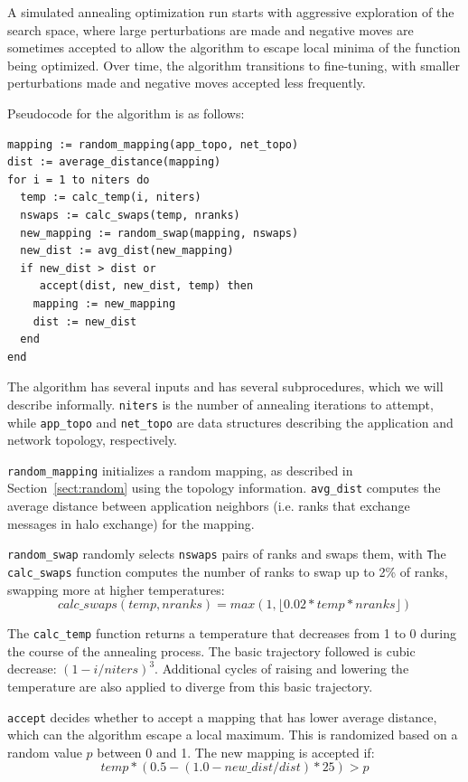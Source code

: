 \documentclass{acm_proc_article-sp}
\begin{document}
A simulated annealing optimization run starts with aggressive exploration
of the search space, where large perturbations are made and negative
moves are sometimes accepted to allow the algorithm to escape local
minima of the function being optimized.  Over time, the algorithm
transitions to fine-tuning, with smaller perturbations made and negative moves
accepted less frequently.

Pseudocode for the algorithm is as follows:

\begin{lstlisting}[frame=lines, basicstyle=\ttfamily,columns=fixed]
mapping := random_mapping(app_topo, net_topo)
dist := average_distance(mapping)
for i = 1 to niters do
  temp := calc_temp(i, niters)
  nswaps := calc_swaps(temp, nranks)
  new_mapping := random_swap(mapping, nswaps)
  new_dist := avg_dist(new_mapping)
  if new_dist > dist or
     accept(dist, new_dist, temp) then
    mapping := new_mapping
    dist := new_dist
  end
end
\end{lstlisting}


The algorithm has several inputs and has several subprocedures,
which we will describe informally.
\texttt{niters} is the number of annealing iterations to attempt, while
\texttt{app\_topo} and \texttt{net\_topo} are data structures
describing the application and network topology, respectively.

\texttt{random\_mapping} initializes a random mapping, as described
in Section~\ref{sect:random} using the topology information.
\texttt{avg\_dist} computes the average distance between
application neighbors (i.e. ranks that exchange messages in
halo exchange) for the mapping.

\texttt{random\_swap} randomly selects \texttt{nswaps} pairs of ranks
and swaps them, with \texttt  The \texttt{calc\_swaps} function computes
the number of ranks to swap up to 2\% of ranks, swapping more at higher
temperatures:
$$calc\_swaps(temp, nranks) = max(1, \lfloor 0.02 * temp * nranks \rfloor)$$

The \texttt{calc\_temp} function returns a temperature that
decreases from 1 to 0 during the course of the annealing process.
The basic trajectory followed is cubic decrease: $(1 - i/niters)^3$.
Additional cycles of raising and lowering the temperature are also
applied to diverge from this basic trajectory.

\texttt{accept} decides whether to accept a mapping that has lower
average distance, which can the algorithm escape a local maximum.
This is randomized based on a random value $p$ between 0 and 1.
The new mapping is accepted if:
$$temp * (0.5 - (1.0 - new\_dist/dist) * 25) > p$$
\end{document}
